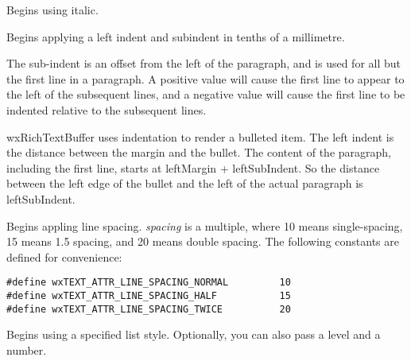 Begins using italic.

\label{wxrichtextctrlbeginleftindent}


Begins applying a left indent and subindent in tenths of a millimetre.

The sub-indent is an offset from the left of the paragraph, and is used for all but the
first line in a paragraph. A positive value will cause the first line to appear to the left
of the subsequent lines, and a negative value will cause the first line to be indented
relative to the subsequent lines.

wxRichTextBuffer uses indentation to render a bulleted item. The left indent is the distance between
the margin and the bullet. The content of the paragraph, including the first line, starts
at leftMargin + leftSubIndent. So the distance between the left edge of the bullet and the
left of the actual paragraph is leftSubIndent.

\label{wxrichtextctrlbeginlinespacing}


Begins appling line spacing. {\it spacing} is a multiple, where 10 means single-spacing,
15 means 1.5 spacing, and 20 means double spacing. The following constants are
defined for convenience:

{\small
\begin{verbatim}
#define wxTEXT_ATTR_LINE_SPACING_NORMAL         10
#define wxTEXT_ATTR_LINE_SPACING_HALF           15
#define wxTEXT_ATTR_LINE_SPACING_TWICE          20
\end{verbatim}
}

\label{wxrichtextctrlbeginliststyle}


Begins using a specified list style. Optionally, you can also pass a level and a number.

\label{wxrichtextctrlbeginnumberedbullet}


